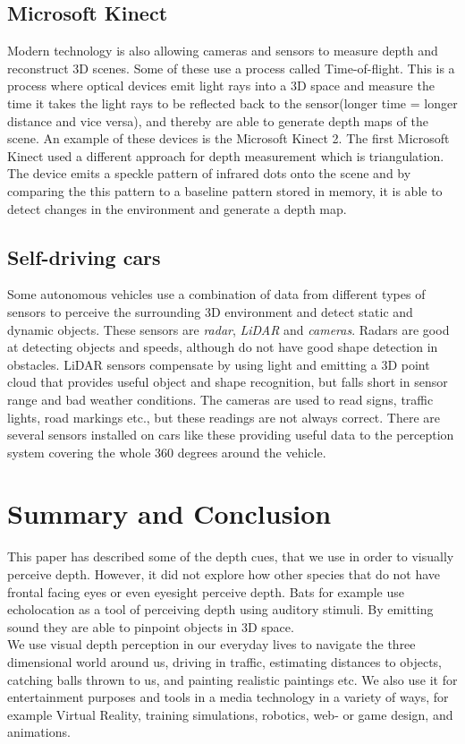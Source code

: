 	\subsection{Microsoft Kinect}
	Modern technology is also allowing cameras and sensors to measure depth and reconstruct 3D scenes. Some of these use a process called Time-of-flight. This is a process where optical devices emit light rays into a 3D space and measure the time it takes the light rays to be reflected back to the sensor(longer time = longer distance and vice versa), and thereby are able to generate depth maps of the scene. An example of these devices is the Microsoft Kinect 2\citep{tof}. The first Microsoft Kinect used a different approach for depth measurement which is triangulation. The device emits a speckle pattern of infrared dots onto the scene and by comparing the this pattern to a baseline pattern stored in memory, it is able to detect changes in the environment and generate a depth map\citep{pointCloud}.
	
	\subsection{Self-driving cars}
	Some autonomous vehicles use a combination of data from different types of sensors to perceive the surrounding 3D environment and detect static and dynamic objects. These sensors are \textit{radar}, \textit{LiDAR} and \textit{cameras}. Radars are good at detecting objects and speeds, although do not have good shape detection in obstacles. LiDAR sensors compensate by using light and emitting a 3D point cloud that provides useful object and shape recognition, but falls short in sensor range and bad weather conditions. The cameras are used to read signs, traffic lights, road markings etc., but these readings are not always correct. There are several sensors installed on cars like these providing useful data to the perception system covering the whole 360 degrees around the vehicle\citep{selfdrivingCars}.
	

\section{Summary and Conclusion}
This paper has described some of the depth cues, that we use in order to visually perceive depth. However, it did not explore how other species that do not have frontal facing eyes or even eyesight perceive depth. Bats for example use echolocation as a tool of perceiving depth using auditory stimuli. By emitting sound they are able to pinpoint objects in 3D space\citep[p.~381]{sensationPerception}.\\

We use visual depth perception in our everyday lives to navigate the three dimensional world around us, driving in traffic, estimating distances to objects, catching balls thrown to us, and painting realistic paintings etc. We also use it for entertainment purposes and tools in a media technology in a variety of ways, for example Virtual Reality, training simulations, robotics, web- or game design, and animations.

